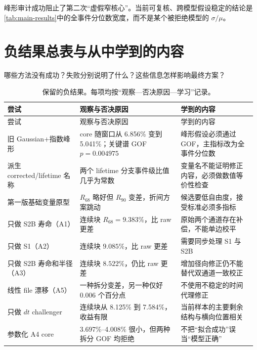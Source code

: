 \documentclass[UTF8,12pt,a4paper,oneside,fontset=none]{ctexart}
\numberwithin{equation}{section}
\newcommand{\Rsixtyeight}{R_{68}}
\newcommand{\Rninety}{R_{90}}
\begin{document}
\begin{conclusionbox}
峰形审计成功阻止了第二次“虚假窄核心”。当前可复核、跨模型假设稳定的结论是
\cref{tab:main-results}中的全事件分位数宽度，而不是某个被拒绝模型的 \(\sigma/\mu\)。
\end{conclusionbox}

\section{负结果总表与从中学到的内容}

\begin{questionbox}
哪些方法没有成功？失败分别说明了什么？这些信息怎样影响最终方案？
\end{questionbox}

\begin{longtable}{p{3.2cm} p{4.0cm} p{4.9cm}}
\caption{保留的负结果。每项均按“观察—否决原因—学习”记录。}
\label{tab:negative-results}\\
\toprule
尝试 & 观察与否决原因 & 学到的内容 \\
\midrule
\endfirsthead
\toprule
尝试 & 观察与否决原因 & 学到的内容 \\
\midrule
\endhead
旧 Gaussian+指数峰形 & core 随窗口从 6.856\% 变到 5.041\%；关键谱 GOF \(p=0.004975\) & 峰形假设必须通过 GOF，主指标改为全事件分位数 \\
派生 corrected/lifetime 名称 & 两个 lifetime 分支事件级比值几乎为常数 & 变量名不能证明修正内容，必须做数值等价性检查 \\
第一版基础变量原型 & \(\Rsixtyeight\) 略好但 \(\Rninety\) 变差，折间方案跳动 & 候选要低自由度，接受标准必须多指标 \\
只做 S2B 寿命（A1） & 连续块 \(\Rsixtyeight=9.383\%\)，比 raw 更差 & 原始两个通道存在补偿，不能单边校平 \\
只做 S1（A2） & 连续块 \(9.085\%\)，比 raw 更差 & 需要同步处理 S1 与 S2B \\
只做 S2B 寿命和半径（A3） & 连续块 \(8.522\%\)，仍比 raw 更差 & 增加径向修正仍不能替代双通道一致校正 \\
线性 file 漂移（A5） & 一种拆分变差，另一种仅好 0.006 个百分点 & 不使用不稳定的时间代理修正 \\
只做 \(dt\) challenger & 连续块从 8.125\% 到 7.584\%，收益有限 & 当前样本的主要剩余结构与横向位置相关 \\
参数化 A4 core & 3.697\%--4.008\% 很小，但两种拆分 GOF 均拒绝 & 不把“拟合成功”误当“模型正确” \\
\bottomrule
\end{longtable}
\end{document}
